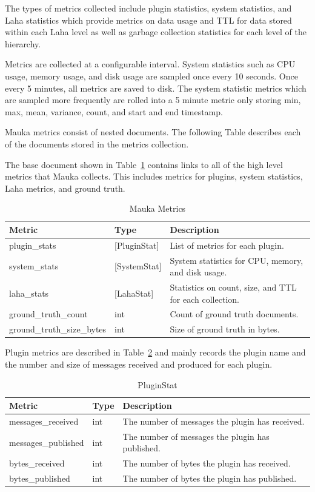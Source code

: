 The types of metrics collected include plugin statistics, system statistics, and Laha statistics which provide metrics on data usage and TTL for data stored within each Laha level as well as garbage collection statistics for each level of the hierarchy.

Metrics are collected at a configurable interval. System statistics such as CPU usage, memory usage, and disk usage are sampled once every 10 seconds. Once every 5 minutes, all metrics are saved to disk. The system statistic metrics which are sampled more frequently are rolled into a 5 minute metric only storing min, max, mean, variance, count, and start and end timestamp.

Mauka metrics consist of nested documents. The following Table describes each of the documents stored in the metrics collection.

The base document shown in Table~\ref{table:Metrics} contains links to all of the high level metrics that Mauka collects. This includes metrics for plugins, system statistics, Laha metrics, and ground truth.

\begin{table}[H]
	\centering
	\caption{Mauka Metrics}
	\begin{tabularx}{\textwidth}{llX}
		\toprule
		\textbf{Metric} & \textbf{Type} & \textbf{Description} \\
		\midrule
		plugin\_stats & [PluginStat] & List of metrics for each plugin. \\
		system\_stats & [SystemStat] & System statistics for CPU, memory, and disk usage. \\
		laha\_stats & [LahaStat] & Statistics on count, size, and TTL for each collection. \\
		ground\_truth\_count & int & Count of ground truth documents. \\
		ground\_truth\_size\_bytes & int & Size of ground truth in bytes. \\
		\bottomrule
	\end{tabularx}
	\label{table:Metrics}
\end{table}

Plugin metrics are described in Table~\ref{table:MetricsPluginStat} and mainly records the plugin name and the number and size of messages received and produced for each plugin.

\begin{table}[H]
	\centering
	\caption{PluginStat}
	\begin{tabularx}{\textwidth}{llX}
		\toprule
		\textbf{Metric} & \textbf{Type} & \textbf{Description} \\
		\midrule
		messages\_received & int & The number of messages the plugin has received. \\
		messages\_published & int & The number of messages the plugin has published. \\
		bytes\_received & int & The number of bytes the plugin has received. \\
		bytes\_published & int & The number of bytes the plugin has published. \\
		\bottomrule
	\end{tabularx}
	\label{table:MetricsPluginStat}
\end{table}

